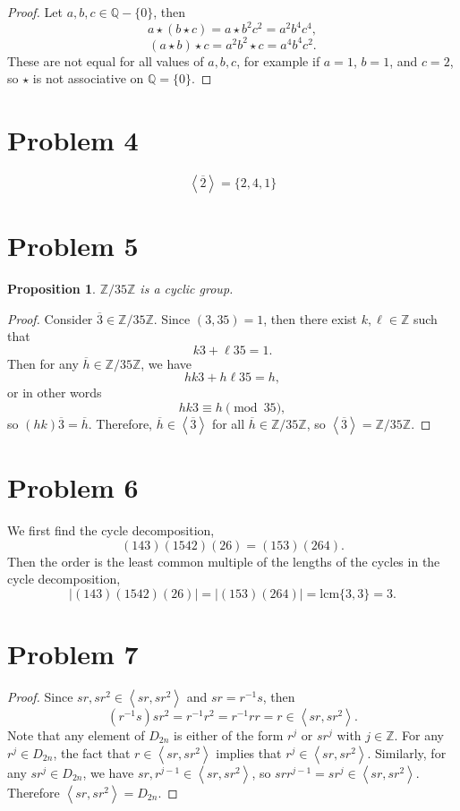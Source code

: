 \documentclass[12pt]{article}
\newtheorem{proposition}{Proposition}
\newcommand{\<}{\left\langle}
\renewcommand{\>}{\right\rangle}
\newcommand{\Z}{\mathbb{Z}}
\newcommand{\Q}{\mathbb{Q}}
\begin{document}
\begin{proof}
    Let $a,b,c\in\Q-\{0\}$, then
    \[a\star (b\star c) = a\star b^2c^2 = a^2b^4c^4,\]
    \[(a\star b) \star c = a^2b^2\star c = a^4b^4c^2.\]
    These are not equal for all values of $a,b,c$, for example if $a=1$, $b=1$, and $c=2$, so $\star$ is not associative on $\Q=\{0\}$.
    
\end{proof}

\section*{Problem 4}

\[\<\overline{2}\> = \{2, 4, 1\}\]

\section*{Problem 5}

\begin{proposition}
    $\Z/35\Z$ is a cyclic group.
\end{proposition}

\begin{proof}
    Consider $\overline{3}\in\Z/35\Z$. Since $(3,35)=1$, then there exist $k,\ell\in\Z$ such that
    \[k3 + \ell35 = 1.\]
    Then for any $\overline{h}\in\Z/35\Z$, we have
    \[hk3 + h\ell35 = h,\]
    or in other words
    \[hk3 \equiv h \pmod{35},\]
    so $(hk)\overline{3} = \overline{h}$. Therefore, $\overline{h}\in\<\overline{3}\>$ for all $\overline{h}\in\Z/35\Z$, so $\<\overline{3}\>=\Z/35\Z$.
    
\end{proof}

\section*{Problem 6}

We first find the cycle decomposition,
\[(143)(1542)(26) = (153)(264).\]
Then the order is the least common multiple of the lengths of the cycles in the cycle decomposition,
\[|(143)(1542)(26)| = |(153)(264)| = \text{lcm}\{3,3\} = 3.\]

\section*{Problem 7}

\begin{proof}
    Since $sr,sr^2\in\<sr,sr^2\>$ and $sr=r^{-1}s$, then
    \[(r^{-1}s)sr^2 = r^{-1}r^2 = r^{-1}rr = r \in \<sr,sr^2\>.\]
    Note that any element of $D_{2n}$ is either of the form $r^j$ or $sr^j$ with $j\in\Z$. For any $r^j\in D_{2n}$, the fact that $r\in\<sr,sr^2\>$ implies that $r^j\in\<sr,sr^2\>$. Similarly, for any $sr^j\in D_{2n}$, we have $sr,r^{j-1}\in\<sr,sr^2\>$, so $srr^{j-1}=sr^j\in\<sr,sr^2\>$. Therefore $\<sr,sr^2\>=D_{2n}$.
    
\end{proof}
\end{document}
